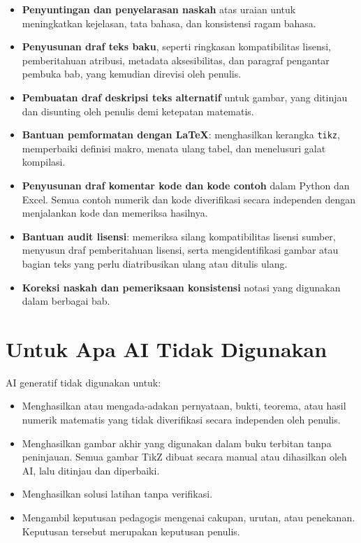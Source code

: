\begin{itemize}
  \item \textbf{Penyuntingan dan penyelarasan naskah} atas uraian untuk
    meningkatkan kejelasan, tata bahasa, dan konsistensi ragam bahasa.
  \item \textbf{Penyusunan draf teks baku}, seperti ringkasan kompatibilitas
    lisensi, pemberitahuan atribusi, metadata aksesibilitas, dan paragraf
    pengantar pembuka bab, yang kemudian direvisi oleh penulis.
  \item \textbf{Pembuatan draf deskripsi teks alternatif} untuk gambar,
    yang ditinjau dan disunting oleh penulis demi ketepatan matematis.
  \item \textbf{Bantuan pemformatan dengan \LaTeX{}}: menghasilkan
    kerangka \texttt{tikz}, memperbaiki definisi makro, menata ulang tabel,
    dan menelusuri galat kompilasi.
  \item \textbf{Penyusunan draf komentar kode dan kode contoh} dalam Python
    dan Excel. Semua contoh numerik dan kode diverifikasi secara independen
    dengan menjalankan kode dan memeriksa hasilnya.
  \item \textbf{Bantuan audit lisensi}: memeriksa silang kompatibilitas
    lisensi sumber, menyusun draf pemberitahuan lisensi, serta mengidentifikasi
    gambar atau bagian teks yang perlu diatribusikan ulang atau ditulis ulang.
  \item \textbf{Koreksi naskah dan pemeriksaan konsistensi} notasi yang
    digunakan dalam berbagai bab.
\end{itemize}

\section*{Untuk Apa AI Tidak Digunakan}

AI generatif tidak digunakan untuk:

\begin{itemize}
  \item Menghasilkan atau mengada-adakan pernyataan, bukti, teorema,
    atau hasil numerik matematis yang tidak diverifikasi secara independen
    oleh penulis.
  \item Menghasilkan gambar akhir yang digunakan dalam buku terbitan tanpa
    peninjauan. Semua gambar TikZ dibuat secara manual atau dihasilkan oleh AI,
    lalu ditinjau dan diperbaiki.
  \item Menghasilkan solusi latihan tanpa verifikasi.
  \item Mengambil keputusan pedagogis mengenai cakupan, urutan, atau
    penekanan. Keputusan tersebut merupakan keputusan penulis.
\end{itemize}

